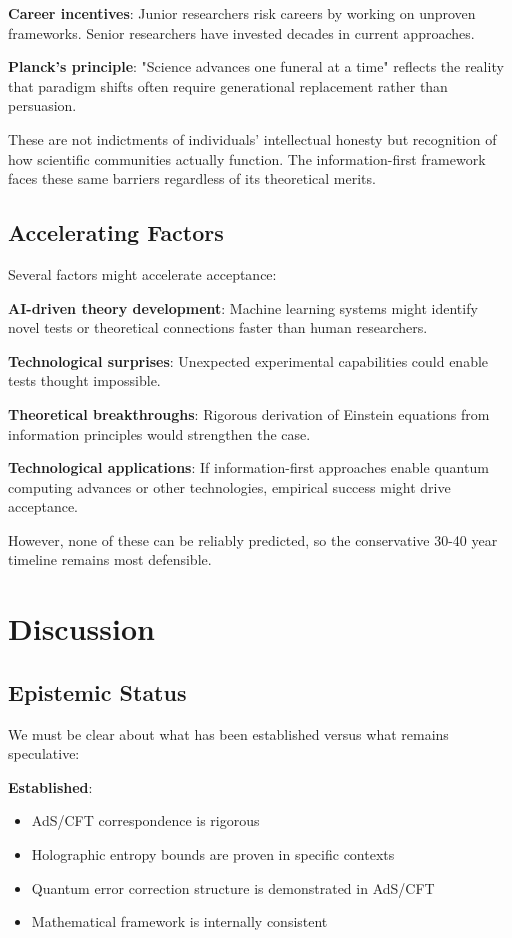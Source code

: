 \documentclass[12pt,twocolumn]{article}
\theoremstyle{definition}
\theoremstyle{remark}
\begin{document}
\textbf{Career incentives}: Junior researchers risk careers by working on unproven frameworks. Senior researchers have invested decades in current approaches.

\textbf{Planck's principle}: "Science advances one funeral at a time" reflects the reality that paradigm shifts often require generational replacement rather than persuasion.

These are not indictments of individuals' intellectual honesty but recognition of how scientific communities actually function. The information-first framework faces these same barriers regardless of its theoretical merits.

\subsection{Accelerating Factors}

Several factors might accelerate acceptance:

\textbf{AI-driven theory development}: Machine learning systems might identify novel tests or theoretical connections faster than human researchers.

\textbf{Technological surprises}: Unexpected experimental capabilities could enable tests thought impossible.

\textbf{Theoretical breakthroughs}: Rigorous derivation of Einstein equations from information principles would strengthen the case.

\textbf{Technological applications}: If information-first approaches enable quantum computing advances or other technologies, empirical success might drive acceptance.

However, none of these can be reliably predicted, so the conservative 30-40 year timeline remains most defensible.

\section{Discussion}

\subsection{Epistemic Status}

We must be clear about what has been established versus what remains speculative:

\textbf{Established}:
\begin{itemize}
\item AdS/CFT correspondence is rigorous
\item Holographic entropy bounds are proven in specific contexts
\item Quantum error correction structure is demonstrated in AdS/CFT
\item Mathematical framework is internally consistent
\end{itemize}
\end{document}
